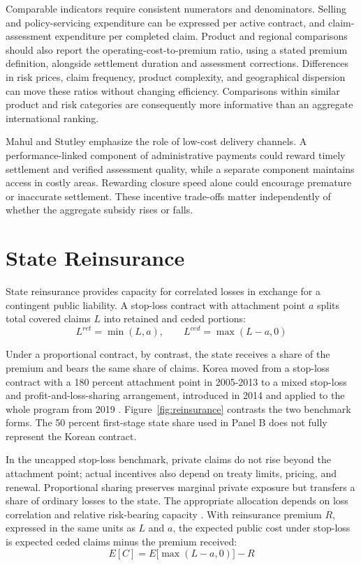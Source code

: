 Comparable indicators require consistent numerators and denominators. Selling and policy-servicing expenditure can be expressed per active contract, and claim-assessment expenditure per completed claim. Product and regional comparisons should also report the operating-cost-to-premium ratio, using a stated premium definition, alongside settlement duration and assessment corrections. Differences in risk prices, claim frequency, product complexity, and geographical dispersion can move these ratios without changing efficiency. Comparisons within similar product and risk categories are consequently more informative than an aggregate international ranking.

Mahul and Stutley \citeyearpar[pp.~84-87]{mahul2010} emphasize the role of low-cost delivery channels. A performance-linked component of administrative payments could reward timely settlement and verified assessment quality, while a separate component maintains access in costly areas. Rewarding closure speed alone could encourage premature or inaccurate settlement. These incentive trade-offs matter independently of whether the aggregate subsidy rises or falls.

\section{State Reinsurance}\label{sec:reinsurance}

State reinsurance provides capacity for correlated losses in exchange for a contingent public liability. A stop-loss contract with attachment point $a$ splits total covered claims $L$ into retained and ceded portions:
\begin{equation}\label{eq:stoploss}
L^{ret} = \min(L,a),\qquad L^{ced} = \max(L - a,0)
\end{equation}

Under a proportional contract, by contrast, the state receives a share of the premium and bears the same share of claims. Korea moved from a stop-loss contract with a 180 percent attachment point in 2005-2013 to a mixed stop-loss and profit-and-loss-sharing arrangement, introduced in 2014 and applied to the whole program from 2019 \citep[pp.~268, 273-274]{mafra2025}. Figure~\ref{fig:reinsurance} contrasts the two benchmark forms. The 50 percent first-stage state share used in Panel B does not fully represent the Korean contract.

In the uncapped stop-loss benchmark, private claims do not rise beyond the attachment point; actual incentives also depend on treaty limits, pricing, and renewal. Proportional sharing preserves marginal private exposure but transfers a share of ordinary losses to the state. The appropriate allocation depends on loss correlation and relative risk-bearing capacity \citep{jia2025}. With reinsurance premium $R$, expressed in the same units as $L$ and $a$, the expected public cost under stop-loss is expected ceded claims minus the premium received:
\begin{equation}\label{eq:publiccost}
E[C] = E\bigl[\max(L - a,0)\bigr] - R
\end{equation}

